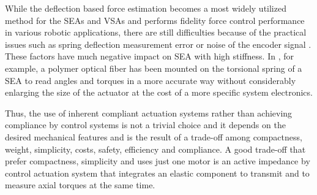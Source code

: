 While the deflection based force estimation becomes a most widely utilized method for the SEAs and VSAs and performs fidelity force control performance in various robotic applications, there are still difficulties because of the practical issues such as spring deflection measurement error or noise of the encoder signal \cite{lee2018integrated}. These factors have much negative impact on SEA with high stiffness. In \cite{leal2018polymer}, for example, a polymer optical fiber has been mounted on the torsional spring of a SEA to read angles and torques in a more accurate way without considerably enlarging the size of the actuator at the cost of a more specific system electronics.
\par Thus, the use of inherent compliant actuation systems rather than achieving compliance by control systems is not a trivial choice and it depends on the desired mechanical features and is the result of a trade-off among compactness, weight, simplicity, costs, safety, efficiency and compliance.
A good trade-off that prefer compactness, simplicity and uses just one motor is an active impedance by control actuation system that integrates an elastic component to transmit and to measure axial torques at the same time.


